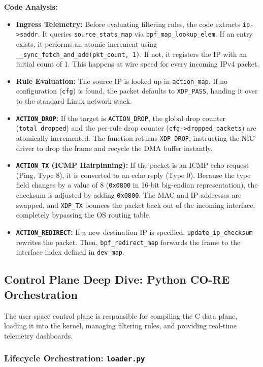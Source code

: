 \documentclass[11pt,a4paper]{article}
\begin{document}
\noindent \textbf{Code Analysis:} 
\begin{itemize}
    \item \textbf{Ingress Telemetry:} Before evaluating filtering rules, the code extracts \texttt{ip->saddr}.
It queries \texttt{source\_stats\_map} via \texttt{bpf\_map\_lookup\_elem}. If an entry exists, it performs an atomic increment using \texttt{\_\_sync\_fetch\_and\_add(pkt\_count, 1)}.
If not, it registers the IP with an initial count of 1. This happens at wire speed for every incoming IPv4 packet.
    \item \textbf{Rule Evaluation:} The source IP is looked up in \texttt{action\_map}.
If no configuration (\texttt{cfg}) is found, the packet defaults to \texttt{XDP\_PASS}, handing it over to the standard Linux network stack.
    \item \textbf{\texttt{ACTION\_DROP}:} If the target is \texttt{ACTION\_DROP}, the global drop counter (\texttt{total\_dropped}) and the per-rule drop counter (\texttt{cfg->dropped\_packets}) are atomically incremented.
The function returns \texttt{XDP\_DROP}, instructing the NIC driver to drop the frame and recycle the DMA buffer instantly.
    \item \textbf{\texttt{ACTION\_TX} (ICMP Hairpinning):} If the packet is an ICMP echo request (Ping, Type 8), it is converted to an echo reply (Type 0).
Because the type field changes by a value of 8 (\texttt{0x0800} in 16-bit big-endian representation), the checksum is adjusted by adding \texttt{0x0800}.
The MAC and IP addresses are swapped, and \texttt{XDP\_TX} bounces the packet back out of the incoming interface, completely bypassing the OS routing table.
    \item \textbf{\texttt{ACTION\_REDIRECT}:} If a new destination IP is specified, \texttt{update\_ip\_checksum} rewrites the packet.
Then, \texttt{bpf\_redirect\_map} forwards the frame to the interface index defined in \texttt{dev\_map}.
\end{itemize}

\subsection{Control Plane Deep Dive: Python CO-RE Orchestration}

The user-space control plane is responsible for compiling the C data plane, loading it into the kernel, managing filtering rules, and providing real-time telemetry dashboards.

\subsubsection{Lifecycle Orchestration: \texttt{loader.py}}
\end{document}
